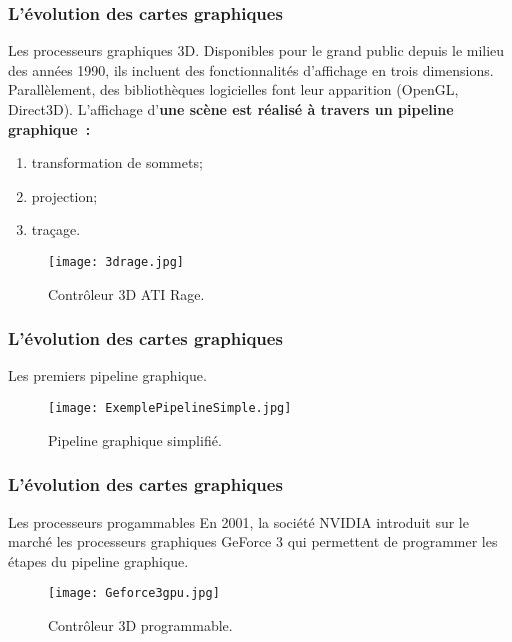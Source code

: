 \begin{frame}
  \frametitle{L'évolution des cartes graphiques}
\begin{block}{Les processeurs graphiques 3D.}
    Disponibles pour le grand public depuis le milieu des années 1990, ils incluent des fonctionnalités
    d'affichage en trois dimensions. Parallèlement, des bibliothèques logicielles font leur apparition
    (OpenGL, Direct3D). L'affichage d'\bf{une scène} est réalisé à travers un \bf{pipeline graphique}~: 
        
        \begin{enumerate}
            \item transformation de sommets;
            \item projection;
            \item traçage.
        \end{enumerate}
    
    \begin{figure}[htbp]
        \centering
       \texttt{[image: 3drage.jpg]} 
        \caption{Contrôleur 3D ATI Rage.}
        \label{fig:ati_rage}
    \end{figure}
\end{block}
\end{frame}

\begin{frame}
  \frametitle{L'évolution des cartes graphiques}
\begin{block}{Les premiers pipeline graphique.}
    \begin{figure}[htbp]
        \centering
       \texttt{[image: ExemplePipelineSimple.jpg]} 
        \caption{Pipeline graphique simplifié.}
        \label{fig:pipeline}
    \end{figure}
\end{block}
\end{frame}


\begin{frame}
  \frametitle{L'évolution des cartes graphiques}
\begin{block}{Les processeurs progammables}
    En 2001, la société NVIDIA introduit sur le marché les processeurs graphiques
    GeForce 3 qui permettent de programmer les étapes du pipeline graphique. 
    \begin{figure}[htbp]
        \centering
       \texttt{[image: Geforce3gpu.jpg]} 
        \caption{Contrôleur 3D programmable.}
        \label{fig:geforce3}
    \end{figure}
\end{block}
\end{frame}

